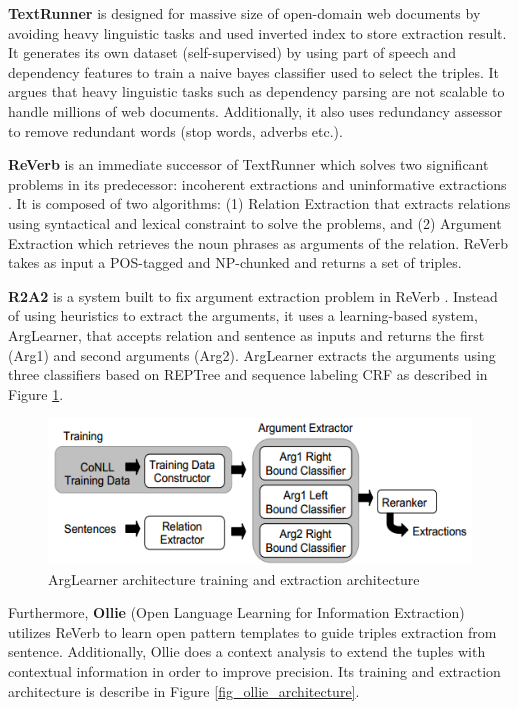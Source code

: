 \documentclass[conference,compsoc,12pt]{IEEEtran}
\begin{document}
\textbf{TextRunner} is designed for massive size of open-domain web documents by avoiding heavy linguistic tasks and used inverted index to store extraction result\cite{banko2007open}. It generates its own dataset (self-supervised) by using part of speech and dependency features to train a naive bayes classifier used to select the triples. It argues that heavy linguistic tasks such as dependency parsing are not scalable to handle millions of web documents. Additionally, it also uses redundancy assessor to remove redundant words (stop words, adverbs etc.).

\textbf{ReVerb} is an immediate successor of TextRunner which solves two significant problems in its predecessor: incoherent extractions and uninformative extractions \cite{fader2011identifying}. It is composed of two algorithms: (1) Relation Extraction that extracts relations using syntactical and lexical constraint to solve the problems, and (2) Argument Extraction which retrieves the noun phrases as arguments of the relation. ReVerb takes as input a POS-tagged and NP-chunked and returns a set of triples.

\textbf{R2A2} is a system built to fix argument extraction problem in ReVerb \cite{etzioni2011open}. Instead of using heuristics to extract the arguments, it uses a learning-based system, ArgLearner, that accepts relation and sentence as inputs and returns the first (Arg1) and second arguments (Arg2). ArgLearner extracts the arguments using three classifiers based on REPTree and sequence labeling CRF as described in Figure \ref{fig_arglearner_architecture}.

\begin{figure}
\centering
\includegraphics[scale=0.5]{../images/arglearner_architecture.png}
\caption{ArgLearner architecture training and extraction architecture}
\label{fig_arglearner_architecture}
\end{figure}

Furthermore, \textbf{Ollie} (Open Language Learning for Information Extraction)\cite{schmitz2012open} utilizes ReVerb\cite{fader2011identifying} to learn open pattern templates to guide triples extraction from sentence. Additionally, Ollie does a context analysis to extend the tuples with contextual information in order to improve precision\cite{schmitz2012open}. Its training and extraction architecture is describe in Figure \ref{fig_ollie_architecture}.
\end{document}
